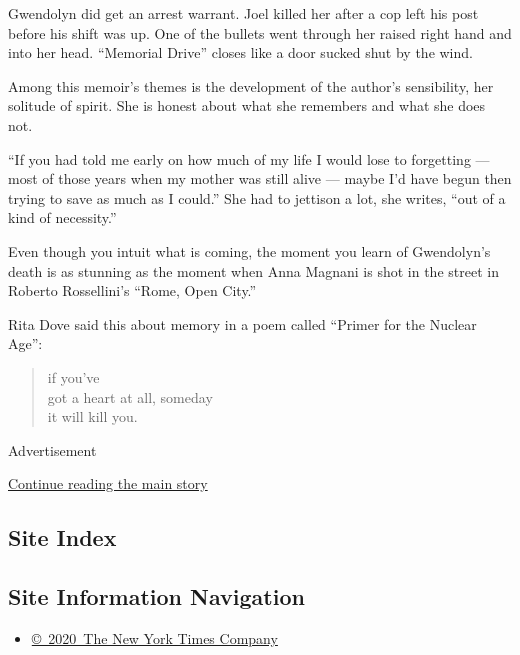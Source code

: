 Gwendolyn did get an arrest warrant. Joel killed her after a cop left
his post before his shift was up. One of the bullets went through her
raised right hand and into her head. ``Memorial Drive'' closes like a
door sucked shut by the wind.

Among this memoir's themes is the development of the author's
sensibility, her solitude of spirit. She is honest about what she
remembers and what she does not.

``If you had told me early on how much of my life I would lose to
forgetting --- most of those years when my mother was still alive ---
maybe I'd have begun then trying to save as much as I could.'' She had
to jettison a lot, she writes, ``out of a kind of necessity.''

Even though you intuit what is coming, the moment you learn of
Gwendolyn's death is as stunning as the moment when Anna Magnani is shot
in the street in Roberto Rossellini's ``Rome, Open City.''

Rita Dove said this about memory in a poem called ``Primer for the
Nuclear Age'':

\begin{quote}
if you've\\
got a heart at all, someday\\
it will kill you.
\end{quote}

Advertisement

\protect\hyperlink{after-bottom}{Continue reading the main story}

\hypertarget{site-index}{%
\subsection{Site Index}\label{site-index}}

\hypertarget{site-information-navigation}{%
\subsection{Site Information
Navigation}\label{site-information-navigation}}

\begin{itemize}
\tightlist
\item
  \href{https://help.nytimes3xbfgragh.onion/hc/en-us/articles/115014792127-Copyright-notice}{©~2020~The
  New York Times Company}
\end{itemize}

